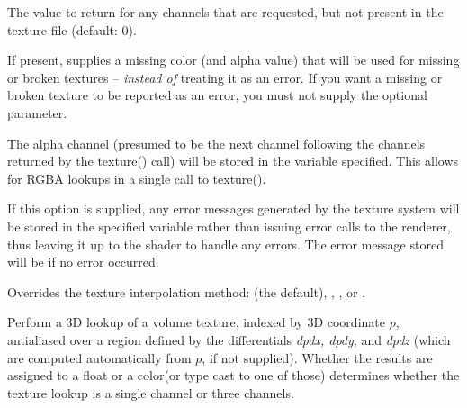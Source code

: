 \documentclass[11pt,letterpaper]{book}
\def\color{{\cf color}\xspace}
\def\float{{\cf float}\xspace}
\begin{document}
\vspace{12pt}
The value to return for any channels that are requested,
but not present in the texture file (default: 0).
\apiend
\vspace{-16pt}

\vspace{12pt}
If present, supplies a missing color (and alpha value) that will
be used for missing or broken textures -- \emph{instead of} treating
it as an error.  If you want a missing or broken texture to be reported
as an error, you must not supply the optional 
parameter.
\apiend
\vspace{-16pt}

\vspace{12pt}
The alpha channel (presumed to be the next channel following the
channels returned by the {\cf texture()} call) will be stored in the
variable specified.  This allows for RGBA lookups in a single call to
{\cf texture()}.
\apiend
\vspace{-16pt}

\vspace{12pt}
If this option is supplied, any error messages generated by the texture
system will be stored in the specified variable rather than issuing error
calls to the renderer, thus leaving it up to the shader to handle any
errors. The error message stored will be \qkw{} if no error occurred.
\apiend
\vspace{-16pt}

\vspace{12pt}
Overrides the texture interpolation method:  (the 
default), , , or .
\apiend
\vspace{-16pt}

\apiend


Perform a 3D lookup of a volume texture, indexed by 3D coordinate
$p$, antialiased over a region defined by the differentials
\emph{dpdx, dpdy}, and \emph{dpdz} (which are computed
automatically from $p$, if not supplied).  Whether the results
are assigned to a \float or a \color (or type cast to one of those)
determines whether the texture lookup is a single channel or three
channels.
\end{document}

